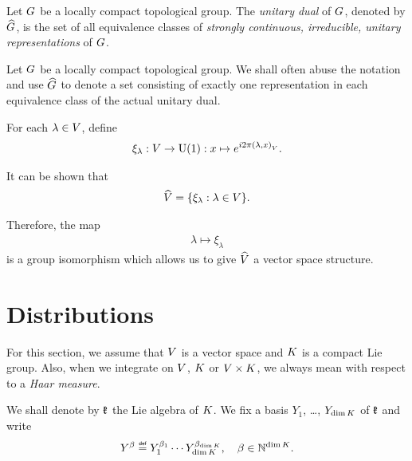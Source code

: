 \begin{definition}
\label{definition:unitary_dual}
    Let $G$ be a locally compact topological group.
    The \emph{unitary dual} of $G$, denoted by ${\widehat{G}}$,
    is the set of all equivalence classes of
    \emph{strongly continuous, irreducible, unitary representations} of $G$.
\end{definition}

\begin{remark}
    Let $G$ be a locally compact topological group.
    We shall often abuse the notation and use ${\widehat{G}}$ to denote a set consisting of
    exactly one representation in each equivalence class of the actual unitary dual.
\end{remark}

\begin{example}[$\dualGroup\VectorSpace$]
    For each $\lambda \in V$,
    define
    \begin{align}
        \xi_\lambda : V \to {\mathrm{U} (1)} : x \mapsto e^{i 2 \pi {\left(\lambda, x\right)_{V}}}.
        \label{eq:elements_of_dual_of_vector_space}
    \end{align}

    It can be shown that
    \begin{align*}
        {\widehat{V}} = \{ \xi_\lambda : \lambda \in V \}.
    \end{align*}

    Therefore, the map
    \begin{align}
        \lambda \mapsto \xi_\lambda
        \label{eq:isomorphism_between_vector_space_and_its_dual_group}
    \end{align}
    is a group isomorphism which allows us to give $\dualGroup\VectorSpace$ a vector space structure.
\end{example}

\section{Distributions}

For this section,
we assume that $V$ is a vector space
and $K$ is a compact Lie group.
Also, when we integrate on $V$, $K$ or $V \times K$,
we always mean with respect to a \emph{Haar measure}.

We shall denote by $\mathfrak{k}$ the Lie algebra of $K$.
We fix a basis $Y_1$, \dots, $Y_{\dim K}$ of $\mathfrak{k}$ and write
\begin{align*}
    Y^\beta \defeq Y_1^{\beta_1} \cdots Y_{\dim \CompactGroup}^{\beta_{\dim \CompactGroup}},
    \quad \beta \in \N^{\dim \CompactGroup}.
\end{align*}

